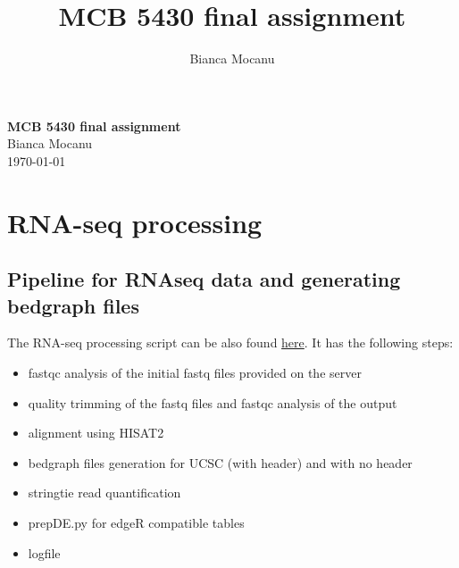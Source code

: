 \documentclass[a4paper,11pt]{article}
\begin{document}



\title{MCB 5430 final assignment}
\author{Bianca Mocanu}

\begin{titlepage}

\begin{center}
\noindent \Large{\textbf{MCB 5430 final assignment}}\\
\vspace{0.7cm}
\small{Bianca Mocanu}\\
\today
\end{center}

\tableofcontents
\end{titlepage}

\section{RNA-seq processing}

\subsection{Pipeline for RNAseq data and generating bedgraph files}

The RNA-seq processing script can be also found \href{https://github.com/biancamocanu/5430_RNAseq/blob/master/pipe.sh}{\color{blue}here\color{black}}. It has the following steps:\\

\begin{itemize}
\item{fastqc analysis of the initial fastq files provided on the server}
\item{quality trimming of the fastq files and fastqc analysis of the output}
\item{alignment using HISAT2}
\item{bedgraph files generation for UCSC (with header) and with no header}
\item{stringtie read quantification}
\item{prepDE.py for edgeR compatible tables}
\item{logfile}

\end{itemize}
\end{document}
